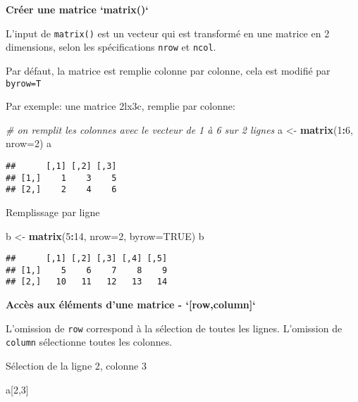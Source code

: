\documentclass[]{book}
\newenvironment{Shaded}{\begin{snugshade}}{\end{snugshade}}
\newcommand{\CommentTok}[1]{\textcolor[rgb]{0.56,0.35,0.01}{\textit{#1}}}
\newcommand{\DataTypeTok}[1]{\textcolor[rgb]{0.13,0.29,0.53}{#1}}
\newcommand{\DecValTok}[1]{\textcolor[rgb]{0.00,0.00,0.81}{#1}}
\newcommand{\KeywordTok}[1]{\textcolor[rgb]{0.13,0.29,0.53}{\textbf{#1}}}
\newcommand{\NormalTok}[1]{#1}
\newcommand{\OperatorTok}[1]{\textcolor[rgb]{0.81,0.36,0.00}{\textbf{#1}}}
\newcommand{\OtherTok}[1]{\textcolor[rgb]{0.56,0.35,0.01}{#1}}
\newcommand{\StringTok}[1]{\textcolor[rgb]{0.31,0.60,0.02}{#1}}
\begin{document}
\textbf{Créer une matrice `matrix()`}

L'input de \texttt{matrix()} est un vecteur qui est transformé en une matrice en 2 dimensions, selon les spécifications \texttt{nrow} et \texttt{ncol}.

Par défaut, la matrice est remplie colonne par colonne, cela est modifié par \texttt{byrow=T}

Par exemple: une matrice 2lx3c, remplie par colonne:

\begin{Shaded}
\begin{Highlighting}[]
\CommentTok{# on remplit les colonnes avec le vecteur de 1 à 6 sur 2 lignes}
\NormalTok{a <-}\StringTok{ }\KeywordTok{matrix}\NormalTok{(}\DecValTok{1}\OperatorTok{:}\DecValTok{6}\NormalTok{, }\DataTypeTok{nrow=}\DecValTok{2}\NormalTok{)}
\NormalTok{a}
\end{Highlighting}
\end{Shaded}

\begin{verbatim}
##      [,1] [,2] [,3]
## [1,]    1    3    5
## [2,]    2    4    6
\end{verbatim}

Remplissage par ligne

\begin{Shaded}
\begin{Highlighting}[]
\NormalTok{b <-}\StringTok{ }\KeywordTok{matrix}\NormalTok{(}\DecValTok{5}\OperatorTok{:}\DecValTok{14}\NormalTok{, }\DataTypeTok{nrow=}\DecValTok{2}\NormalTok{, }\DataTypeTok{byrow=}\OtherTok{TRUE}\NormalTok{)}
\NormalTok{b}
\end{Highlighting}
\end{Shaded}

\begin{verbatim}
##      [,1] [,2] [,3] [,4] [,5]
## [1,]    5    6    7    8    9
## [2,]   10   11   12   13   14
\end{verbatim}

\textbf{Accès aux éléments d'une matrice - `[row,column]`}

L'omission de \texttt{row} correspond à la sélection de toutes les lignes. L'omission de \texttt{column} sélectionne toutes les colonnes.

Sélection de la ligne 2, colonne 3

\begin{Shaded}
\begin{Highlighting}[]
\NormalTok{a[}\DecValTok{2}\NormalTok{,}\DecValTok{3}\NormalTok{]}
\end{Highlighting}
\end{Shaded}
\end{document}
